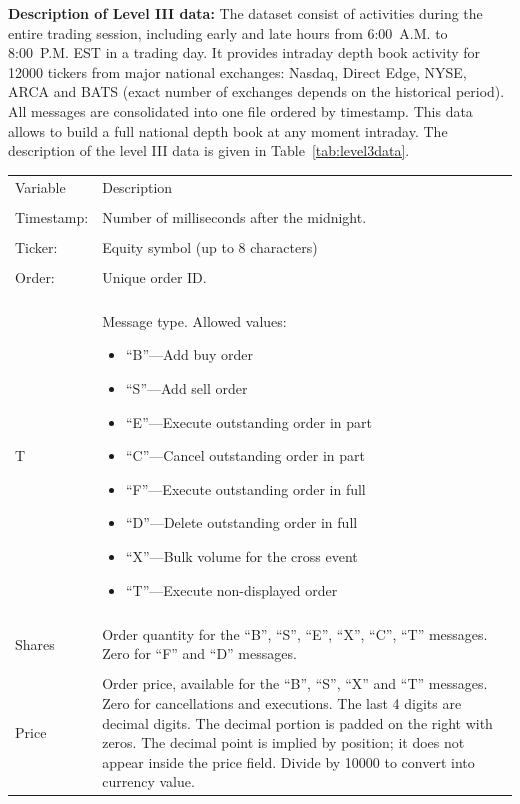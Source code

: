 \noindent\textbf{Description of Level III data:} The dataset consist of activities during the entire trading session, including early and late hours from 6:00~A.M. to 8:00~P.M. EST in a trading day. It provides intraday depth book activity for 12000 tickers from major national exchanges: Nasdaq, Direct Edge, NYSE, ARCA and BATS (exact number of exchanges depends on the historical period). All messages are consolidated into one file ordered by timestamp. This data allows to build a full national depth book at any moment intraday. The description of the level III data is given in Table~\ref{tab:level3data}. \\
	\begin{table}[!ht]
	\centering
	\begin{tabular}{lp{}} \hline
	Variable & Description \\
	& \\
	Timestamp: & Number of milliseconds after the midnight. \\
	& \\
	Ticker: & Equity symbol (up to 8 characters) \\
	& \\
	Order: & Unique order ID. \\
	& \\
	T & Message type. Allowed values: \newline \begin{minipage}[t]{0.6\textwidth} \begin{itemize} \item ``B''---Add buy order \item ``S''---Add sell order \item ``E''---Execute outstanding order in part \item ``C''---Cancel outstanding order in part \item ``F''---Execute outstanding order in full \item ``D''---Delete outstanding order in full \item ``X''---Bulk volume for the cross event \item ``T''---Execute non-displayed order \end{itemize} \end{minipage} \\
	& \\
	Shares & Order quantity for the ``B'', ``S'', ``E'', ``X'', ``C'', ``T'' messages. Zero for ``F'' and ``D'' messages. \\
	& \\
	Price & Order price, available for the ``B'', ``S'', ``X'' and ``T'' messages. \newline Zero for cancellations and executions. The last 4 digits are decimal digits. The decimal portion is padded on the right with zeros. The decimal point is implied by position; it does not appear inside the price field. Divide by 10000 to convert into currency value. \\ 

\end{tabular}
\end{table}
